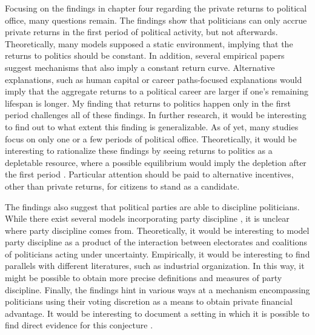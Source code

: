 Focusing on the findings in chapter four regarding the private returns to political office, many questions remain. The findings show that politicians can only accrue private returns in the first period of political activity, but not afterwards. Theoretically, many models supposed a static environment, implying that the returns to politics should be constant. In addition, several empirical papers \citep{baltrunaite2020political, bourveau2021political} suggest mechanisms that also imply a constant return curve. Alternative explanations, such as human capital or career paths-focused explanations \citep{eggers2009mps} would imply that the aggregate returns to a political career are larger if one's remaining lifespan is longer. My finding that returns to politics happen only in the first period challenges all of these findings. In further research, it would be interesting to find out to what extent this finding is generalizable. As of yet, many studies focus on only one or a few periods of political office. Theoretically, it would be interesting to rationalize these findings by seeing returns to politics as a depletable resource, where a possible equilibrium would imply the depletion after the first period \citep[cf.][, p. 74]{acemoglu2013political}. Particular attention should be paid to alternative incentives, other than private returns, for citizens to stand as a candidate. 

The findings also suggest that political parties are able to discipline politicians. While there exist several models incorporating party discipline \citep{eguia2011voting, curto2018party}, it is unclear where party discipline comes from. Theoretically, it would be interesting to model party discipline as a product of the interaction between electorates and coalitions of politicians acting under uncertainty. Empirically, it would be interesting to find parallels with different literatures, such as industrial organization. In this way, it might be possible to obtain more precise definitions and measures of party discipline. Finally, the findings hint in various ways at a mechanism encompassing politicians using their voting discretion as a means to obtain private financial advantage. It would be interesting to document a setting in which it is possible to find direct evidence for this conjecture \citep[as in][]{tahoun2019personal}.


\clearpage




